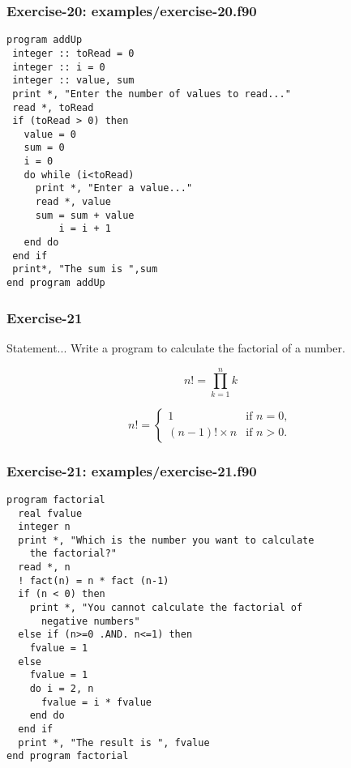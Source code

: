 \documentclass[xcolor=dvipsnames,dvip,notes=show,table]{beamer}
\begin{document}
\begin{frame}[fragile]
\frametitle{Exercise-20: examples/exercise-20.f90}
\scriptsize
\begin{lstlisting}
program addUp
 integer :: toRead = 0
 integer :: i = 0
 integer :: value, sum
 print *, "Enter the number of values to read..."
 read *, toRead 
 if (toRead > 0) then
   value = 0
   sum = 0
   i = 0
   do while (i<toRead)
	 print *, "Enter a value..."
	 read *, value 
 	 sum = sum + value
         i = i + 1
   end do
 end if
 print*, "The sum is ",sum
end program addUp
\end{lstlisting}
\end{frame}



\begin{frame}[fragile]
\frametitle{Exercise-21}
\begin{block}{Statement...}
Write a program to calculate the factorial of a number.
\end{block}


\begin{equation}
n!=\prod_{k=1}^n k \!  
\end{equation}


\begin{equation}
n! = \begin{cases}
1 & \text{if } n = 0, \\
(n-1)!\times n & \text{if } n > 0.
\end{cases}
\end{equation}


\end{frame}


\begin{frame}[fragile]
\frametitle{Exercise-21: examples/exercise-21.f90}
\scriptsize
\begin{lstlisting}
program factorial
  real fvalue
  integer n
  print *, "Which is the number you want to calculate 
    the factorial?"
  read *, n
  ! fact(n) = n * fact (n-1)
  if (n < 0) then 
    print *, "You cannot calculate the factorial of 
      negative numbers"
  else if (n>=0 .AND. n<=1) then
    fvalue = 1
  else
    fvalue = 1
    do i = 2, n
      fvalue = i * fvalue
    end do
  end if
  print *, "The result is ", fvalue
end program factorial
\end{lstlisting}
\end{frame}
\end{document}
